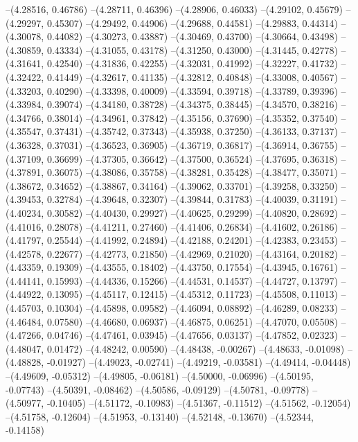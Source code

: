 --(4.28516, 0.46786)
--(4.28711, 0.46396)
--(4.28906, 0.46033)
--(4.29102, 0.45679)
--(4.29297, 0.45307)
--(4.29492, 0.44906)
--(4.29688, 0.44581)
--(4.29883, 0.44314)
--(4.30078, 0.44082)
--(4.30273, 0.43887)
--(4.30469, 0.43700)
--(4.30664, 0.43498)
--(4.30859, 0.43334)
--(4.31055, 0.43178)
--(4.31250, 0.43000)
--(4.31445, 0.42778)
--(4.31641, 0.42540)
--(4.31836, 0.42255)
--(4.32031, 0.41992)
--(4.32227, 0.41732)
--(4.32422, 0.41449)
--(4.32617, 0.41135)
--(4.32812, 0.40848)
--(4.33008, 0.40567)
--(4.33203, 0.40290)
--(4.33398, 0.40009)
--(4.33594, 0.39718)
--(4.33789, 0.39396)
--(4.33984, 0.39074)
--(4.34180, 0.38728)
--(4.34375, 0.38445)
--(4.34570, 0.38216)
--(4.34766, 0.38014)
--(4.34961, 0.37842)
--(4.35156, 0.37690)
--(4.35352, 0.37540)
--(4.35547, 0.37431)
--(4.35742, 0.37343)
--(4.35938, 0.37250)
--(4.36133, 0.37137)
--(4.36328, 0.37031)
--(4.36523, 0.36905)
--(4.36719, 0.36817)
--(4.36914, 0.36755)
--(4.37109, 0.36699)
--(4.37305, 0.36642)
--(4.37500, 0.36524)
--(4.37695, 0.36318)
--(4.37891, 0.36075)
--(4.38086, 0.35758)
--(4.38281, 0.35428)
--(4.38477, 0.35071)
--(4.38672, 0.34652)
--(4.38867, 0.34164)
--(4.39062, 0.33701)
--(4.39258, 0.33250)
--(4.39453, 0.32784)
--(4.39648, 0.32307)
--(4.39844, 0.31783)
--(4.40039, 0.31191)
--(4.40234, 0.30582)
--(4.40430, 0.29927)
--(4.40625, 0.29299)
--(4.40820, 0.28692)
--(4.41016, 0.28078)
--(4.41211, 0.27460)
--(4.41406, 0.26834)
--(4.41602, 0.26186)
--(4.41797, 0.25544)
--(4.41992, 0.24894)
--(4.42188, 0.24201)
--(4.42383, 0.23453)
--(4.42578, 0.22677)
--(4.42773, 0.21850)
--(4.42969, 0.21020)
--(4.43164, 0.20182)
--(4.43359, 0.19309)
--(4.43555, 0.18402)
--(4.43750, 0.17554)
--(4.43945, 0.16761)
--(4.44141, 0.15993)
--(4.44336, 0.15266)
--(4.44531, 0.14537)
--(4.44727, 0.13797)
--(4.44922, 0.13095)
--(4.45117, 0.12415)
--(4.45312, 0.11723)
--(4.45508, 0.11013)
--(4.45703, 0.10304)
--(4.45898, 0.09582)
--(4.46094, 0.08892)
--(4.46289, 0.08233)
--(4.46484, 0.07580)
--(4.46680, 0.06937)
--(4.46875, 0.06251)
--(4.47070, 0.05508)
--(4.47266, 0.04746)
--(4.47461, 0.03945)
--(4.47656, 0.03137)
--(4.47852, 0.02323)
--(4.48047, 0.01472)
--(4.48242, 0.00590)
--(4.48438, -0.00267)
--(4.48633, -0.01098)
--(4.48828, -0.01927)
--(4.49023, -0.02741)
--(4.49219, -0.03581)
--(4.49414, -0.04448)
--(4.49609, -0.05312)
--(4.49805, -0.06181)
--(4.50000, -0.06996)
--(4.50195, -0.07743)
--(4.50391, -0.08462)
--(4.50586, -0.09129)
--(4.50781, -0.09778)
--(4.50977, -0.10405)
--(4.51172, -0.10983)
--(4.51367, -0.11512)
--(4.51562, -0.12054)
--(4.51758, -0.12604)
--(4.51953, -0.13140)
--(4.52148, -0.13670)
--(4.52344, -0.14158)
